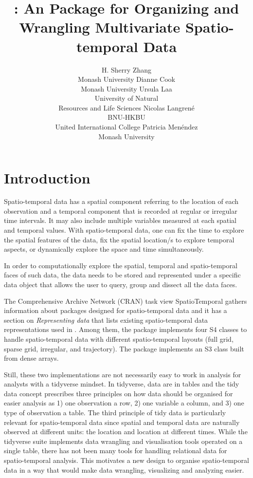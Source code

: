 \documentclass[
  shortnames]{jss}
\author{
H. Sherry Zhang\\Monash University \And Dianne Cook\\Monash University \And Ursula Laa\\University of Natural \\ Resources and Life Sciences \AND Nicolas Langrené\\BNU-HKBU \\ United International College \And Patricia Menéndez\\Monash University
}
\title{\pkg{cubble}: An \proglang{R} Package for Organizing and Wrangling Multivariate Spatio-temporal Data}
\begin{document}
\hypertarget{introduction}{%
\section{Introduction}\label{introduction}}

Spatio-temporal data has a spatial component referring to the location of each observation and a temporal component that is recorded at regular or irregular time intervals. It may also include multiple variables measured at each spatial and temporal values. With spatio-temporal data, one can fix the time to explore the spatial features of the data, fix the spatial location/s to explore temporal aspects, or dynamically explore the space and time simultaneously.

In order to computationally explore the spatial, temporal and spatio-temporal faces of such data, the data needs to be stored and represented under a specific data object that allows the user to query, group and dissect all the data faces.

The Comprehensive  Archive Network (CRAN) task view SpatioTemporal \citep{ctvspatiotemporal} gathers information about  packages designed for spatio-temporal data and it has a section on \emph{Representing data} that lists existing spatio-temporal data representations used in . Among them, the  package \citep{spacetime} implements four S4 classes to handle spatio-temporal data with different spatio-temporal layouts (full grid, sparse grid, irregular, and trajectory). The  package \citep{stars} implements an S3 class built from dense arrays.

Still, these two implementations are not necessarily easy to work in analysis for analysts with a tidyverse mindset. In tidyverse, data are in tables and the tidy data concept \citep{tidydata} prescribes three principles on how data should be organised for easier analysis as 1) one observation a row, 2) one variable a column, and 3) one type of observation a table. The third principle of tidy data is particularly relevant for spatio-temporal data since spatial and temporal data are naturally observed at different units: the location and location at different times. While the tidyverse suite implements data wrangling and visualisation tools operated on a single table, there has not been many tools for handling relational data for spatio-temporal analysis. This motivates a new design to organise spatio-temporal data in a way that would make data wrangling, visualizing and analyzing easier.
\end{document}
